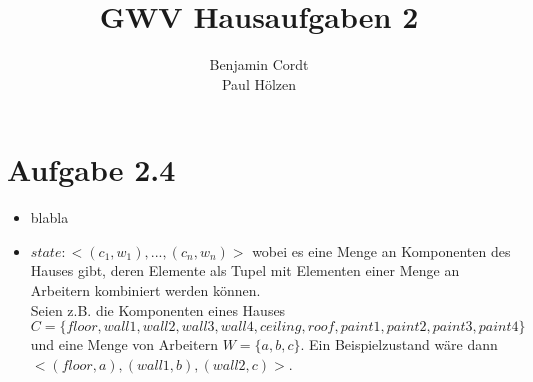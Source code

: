 \documentclass[12pt, paper=a4]{article}
\author{Benjamin Cordt\\Paul Hölzen}
\title{GWV Hausaufgaben 2}
\begin{document}
\maketitle

\section*{Aufgabe 2.4}
\begin{itemize}
\item blabla
\item $state: <(c_1, w_1), ..., (c_n, w_n)>$ wobei es eine Menge an Komponenten des Hauses gibt,
      deren Elemente als Tupel mit Elementen einer Menge an Arbeitern kombiniert werden können.\\
      Seien z.B. die Komponenten eines Hauses\\
      $C=\{floor, wall 1, wall 2, wall 3, wall 4, ceiling, roof, paint 1, paint 2,
      paint 3, paint 4\}$ und eine Menge von Arbeitern $W=\{a, b, c\}$.
      Ein Beispielzustand wäre dann $<(floor, a), (wall 1, b), (wall 2, c)>$.\\
\end{itemize}
\end{document}
